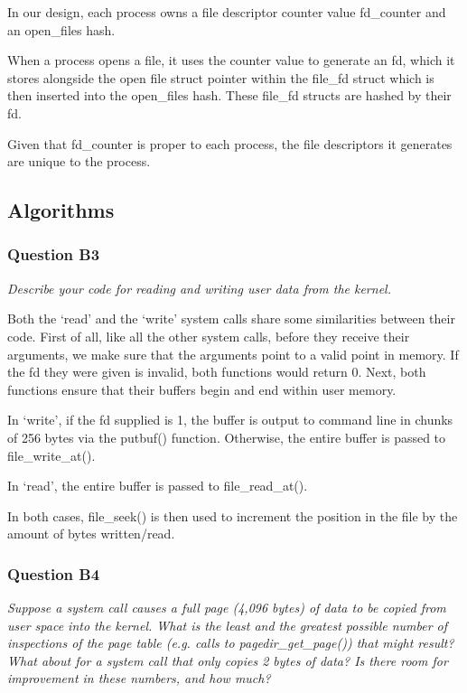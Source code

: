 In our design, each process owns a file descriptor counter value fd\_counter and an open\_files hash.

When a process opens a file, it uses the counter value to generate an fd, which it stores alongside the open file struct pointer within the file\_fd struct which is then inserted into the open\_files hash. These file\_fd structs are hashed by their fd.

Given that fd\_counter is proper to each process, the file descriptors it generates are unique to the process.

\subsection{Algorithms}
\subsubsection*{Question B3} %
\textit{Describe your code for reading and writing user data from the kernel.}

Both the `read' and the `write' system calls share some similarities between their code.
First of all, like all the other system calls, before they receive their arguments, we make sure that the arguments point to a valid point in memory.
If the fd they were given is invalid, both functions would return 0.
Next, both functions ensure that their buffers begin and end within user memory.

In `write', if the fd supplied is 1, the buffer is output to command line in chunks of 256 bytes via the putbuf() function. Otherwise, the entire buffer is passed to file\_write\_at().

In `read', the entire buffer is passed to file\_read\_at().

In both cases, file\_seek() is then used to increment the position in the file by the amount of bytes written/read.

\subsubsection*{Question B4} %
\textit{Suppose a system call causes a full page (4,096 bytes) of data to be copied from user space into the kernel.  What is the least and the greatest possible number of inspections of the page table (e.g. calls to pagedir\_get\_page()) that might result?  What about for a system call that only copies 2 bytes of data?  Is there room for improvement in these numbers, and how much?}

